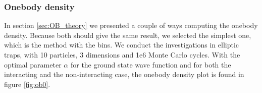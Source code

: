 \documentclass[norsk,a4paper,12pt]{article}
\begin{document}

\subsubsection{Onebody density}
In section \ref{sec:OB_theory} we presented a couple of ways computing the onebody density. Because both should give the same result, we selected the simplest one, which is the method with the bins. We conduct the investigations in elliptic traps, with 10 particles, 3 dimensions and 1e6 Monte Carlo cycles. With the optimal parameter $\alpha$ for the ground state wave function and for both the interacting and the non-interacting case, the onebody density plot is found in figure \ref{fig:ob0}.
\end{document}
